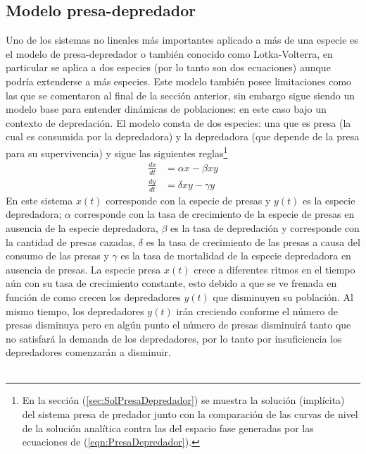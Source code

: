 \subsection{Modelo presa-depredador}

Uno de los sistemas no lineales más importantes aplicado a más de una especie es el modelo de presa-depredador o también conocido como Lotka-Volterra, en particular se aplica a dos especies (por lo tanto son dos ecuaciones) aunque podría extenderse a más especies. Este modelo también posee limitaciones como las que se comentaron al final de la sección anterior, sin embargo sigue siendo un modelo base para entender dinámicas de poblaciones: en este caso bajo un contexto de depredación. El modelo consta de dos especies: una que es presa (la cual es consumida por la depredadora) y la depredadora (que depende de la presa para su supervivencia) y sigue las siguientes reglas\footnote{En la sección (\ref{sec:SolPresaDepredador}) se muestra la solución (implícita) del sistema presa de predador junto con la comparación de las curvas de nivel de la solución analítica contra las del espacio fase generadas por las ecuaciones de (\ref{eqn:PresaDepredador}).}
\begin{equation}\label{eqn:PresaDepredador}
	\begin{split}
		\frac{dx}{dt} &= \alpha x - \beta xy\\
		\frac{dy}{dt} &= \delta xy -\gamma y
	\end{split}
\end{equation}
En este sistema $x(t)$ corresponde con la especie de presas y $y(t)$ es la especie depredadora; $\alpha$ corresponde con la tasa de crecimiento de la especie de presas en ausencia de la especie depredadora, $\beta$ es la tasa de depredación y corresponde con la cantidad de presas cazadas, $\delta$ es la tasa de crecimiento de las presas a causa del consumo de las presas y $\gamma$ es la tasa de mortalidad de la especie depredadora en ausencia de presas. La especie presa $x(t)$ crece a diferentes ritmos en el tiempo aún con su tasa de crecimiento constante, esto debido a que se ve frenada en función de como crecen los depredadores $y(t)$ que disminuyen su población. Al mismo tiempo, los depredadores $y(t)$ irán creciendo conforme el número de presas disminuya pero en algún punto el número de presas disminuirá tanto que no satisfará la demanda de los depredadores, por lo tanto por insuficiencia los depredadores comenzarán a disminuir. \\
\\

